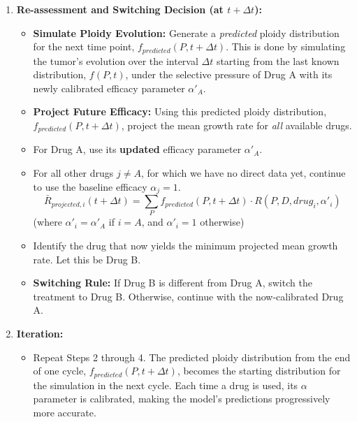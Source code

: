 \documentclass{article}
\begin{document}
\begin{enumerate}
    \item \textbf{Re-assessment and Switching Decision (at $t+\Delta t$):}
    \begin{itemize}
        \item \textbf{Simulate Ploidy Evolution:} \color{blue} Generate a \textit{predicted} ploidy distribution for the next time point, $f_{predicted}(P, t+\Delta t)$. This is done by simulating the tumor's evolution over the interval $\Delta t$ starting from the last known distribution, $f(P, t)$, under the selective pressure of Drug A with its newly calibrated efficacy parameter $\alpha'_A$.
        \item \textbf{Project Future Efficacy:} Using this predicted ploidy distribution, $f_{predicted}(P, t+\Delta t)$, project the mean growth rate for \textit{all} available drugs. \color{black}
        \item For Drug A, use its \textbf{updated} efficacy parameter $\alpha'_A$.
        \item For all other drugs $j \neq A$, for which we have no direct data yet, continue to use the baseline efficacy $\alpha_j=1$.
        $$ \bar{R}_{projected, i}(t+\Delta t) = \sum_{P} f_{predicted}(P, t+\Delta t) \cdot R(P, D, drug_i, \alpha'_i) $$
        (where $\alpha'_i = \alpha'_A$ if $i=A$, and $\alpha'_i = 1$ otherwise)
        \item Identify the drug that now yields the minimum projected mean growth rate. Let this be Drug B.
        \item \textbf{Switching Rule:} If Drug B is different from Drug A, switch the treatment to Drug B. Otherwise, continue with the now-calibrated Drug A.
    \end{itemize}
    
    \item \textbf{Iteration:}
    \begin{itemize}
        \item Repeat Steps 2 through 4. The predicted ploidy distribution from the end of one cycle, $f_{predicted}(P, t+\Delta t)$, becomes the starting distribution for the simulation in the next cycle. Each time a drug is used, its $\alpha$ parameter is calibrated, making the model's predictions progressively more accurate.
    \end{itemize}
\end{enumerate}

\end{document}
